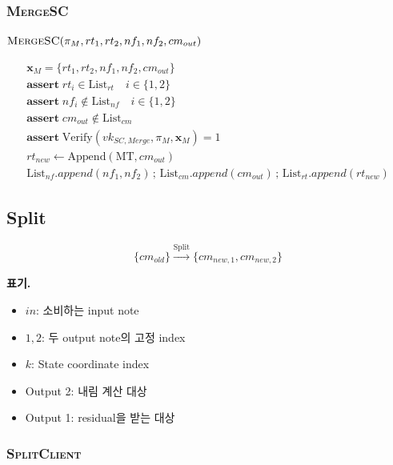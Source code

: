 \documentclass[11pt,a4paper]{extarticle}
\newcommand{\Verify}{\mathrm{Verify}}
\newcommand{\Append}{\mathrm{Append}}
\newcommand{\Assert}{\mathbf{assert}\;}
\newcommand{\List}[1]{\mathrm{List}_{#1}}
\newcommand{\MT}{\mathrm{MT}}
\newenvironment{schemeblock}
{%
  \begingroup
  \setlength{\jot}{8pt}%
  \setlength{\parskip}{0pt}%
  \setlength{\abovedisplayskip}{9pt}%
  \setlength{\belowdisplayskip}{0pt}%
  \setlength{\abovedisplayshortskip}{9pt}%
  \setlength{\belowdisplayshortskip}{0pt}%
  \begin{mdframed}[
    linewidth=0.4pt,
    linecolor=black,
    innerleftmargin=8pt,
    innerrightmargin=8pt,
    innertopmargin=8pt,
    innerbottommargin=8pt,
    skipabove=0pt,
    skipbelow=5pt,
    splittopskip=8pt,
    splitbottomskip=8pt
  ]
  \centering
}
{%
  \end{mdframed}
  \endgroup
}
\begin{document}
\subsubsection{\textsc{MergeSC}}

\begin{schemeblock}
\(
  \textsc{MergeSC}(\pi_M,rt_1,rt_2,nf_1,nf_2,cm_{out})
\)

\begin{gather*}
\mathbf{x}_M=\{rt_1,rt_2,nf_1,nf_2,cm_{out}\}
  \\
\Assert rt_i\in\List{rt}
  \quad i\in\{1,2\}
  \\
\Assert nf_i\notin\List{nf}
  \quad i\in\{1,2\}
  \\
\Assert cm_{out}\notin\List{cm}
  \\
\Assert
  \Verify(vk_{SC,Merge},\pi_M,\mathbf{x}_M)=1
  \\
rt_{new}\gets\Append(\MT,cm_{out})
  \\
\List{nf}.append(nf_1,nf_2)
  \,;\,
  \List{cm}.append(cm_{out})
  \,;\,
  \List{rt}.append(rt_{new})
\end{gather*}
\end{schemeblock}

\subsection{Split}

\[
  \{cm_{old}\}
  \xrightarrow{\mathrm{Split}}
  \{cm_{new,1},cm_{new,2}\}
\]

\noindent\textbf{표기.}
\begin{itemize}[nosep]
  \item $in$: 소비하는 input note
  \item $1,2$: 두 output note의 고정 index
  \item $k$: State coordinate index
  \item Output 2: 내림 계산 대상
  \item Output 1: residual을 받는 대상
\end{itemize}

\subsubsection{\textsc{SplitClient}}
\end{document}
